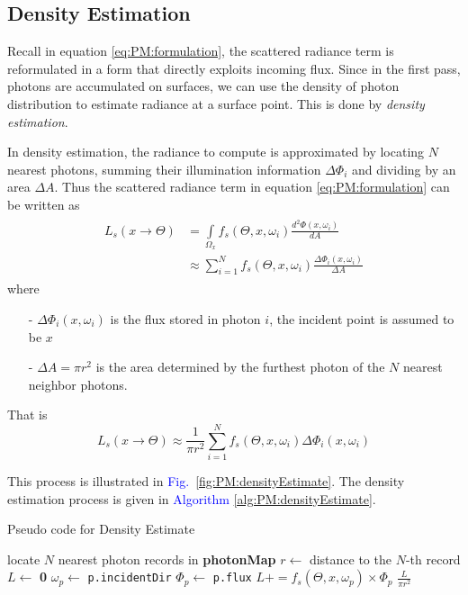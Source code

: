 \documentclass[]{book}
\renewcommand{\figurename}{\textcolor{blue}{Fig.\ }}
\begin{document}
\subsection{Density Estimation}
\label{sec:PM:render:densityEstimate}
Recall in equation \ref{eq:PM:formulation}, the scattered radiance term is reformulated in a form that directly exploits incoming flux.
Since in the first pass, photons are accumulated on surfaces, we can use the density of photon distribution to estimate radiance at a surface point.
This is done by \textit{density estimation}.

In density estimation, the radiance to compute is approximated by locating $N$ nearest photons, summing their illumination information $\Delta \Phi_i$ and dividing by an area $\Delta A$.
Thus the scattered radiance term in equation \ref{eq:PM:formulation} can be written as
\begin{gather*}
\begin{aligned}
	L_s (x \rightarrow \Theta) &= \int\limits_{\Omega_{x}} f_{s}(\Theta, x, \omega_i) \frac{d^2 \Phi(x, \omega_i)}{d A}\\
	&\approx \sum_{i=1}^{N} f_{s}(\Theta, x, \omega_i) \frac{\Delta \Phi_i(x, \omega_i)}{\Delta A}
\end{aligned}
\end{gather*}
where
\begin{itemize}
	\item[-] $\Delta \Phi_i(x, \omega_i)$ is the flux stored in photon $i$, the incident point is assumed to be $x$
	\item[-] $\Delta A = \pi r^2$ is the area determined by the furthest photon of the $N$ nearest neighbor photons.
\end{itemize}
That is
\begin{equation}
	\label{eq:PM:densityEstimate}
	L_s (x \rightarrow \Theta) \approx \frac{1}{\pi r^2} \sum_{i=1}^{N} f_{s}(\Theta, x, \omega_i) \Delta \Phi_i(x, \omega_i)
\end{equation}

This process is illustrated in \figurename \ref{fig:PM:densityEstimate}.
The density estimation process is given in \textcolor{blue}{Algorithm \ref{alg:PM:densityEstimate}}.

\begin{algorithm}[b]
	\caption[Density Estimate]{Pseudo code for Density Estimate}
	\label{alg:PM:densityEstimate}
	\begin{algorithmic}[1]
			\State locate $N$ nearest photon records in \textbf{photonMap}
			\State $r\gets$ distance to the $N$-th record
			\State $L\gets$ \textbf{0}
				\State $\omega_p \gets$ \texttt{p.incidentDir}
				\State $\Phi_p \gets$ \texttt{p.flux}
				\State $L \mathrel{{+}{=}} f_s(\Theta, x, \omega_p) \times \Phi_p$
			\EndFor
			\State \Return $\frac{L}{\pi r^2}$
		\EndProcedure
	\end{algorithmic}
\end{algorithm}
\end{document}
